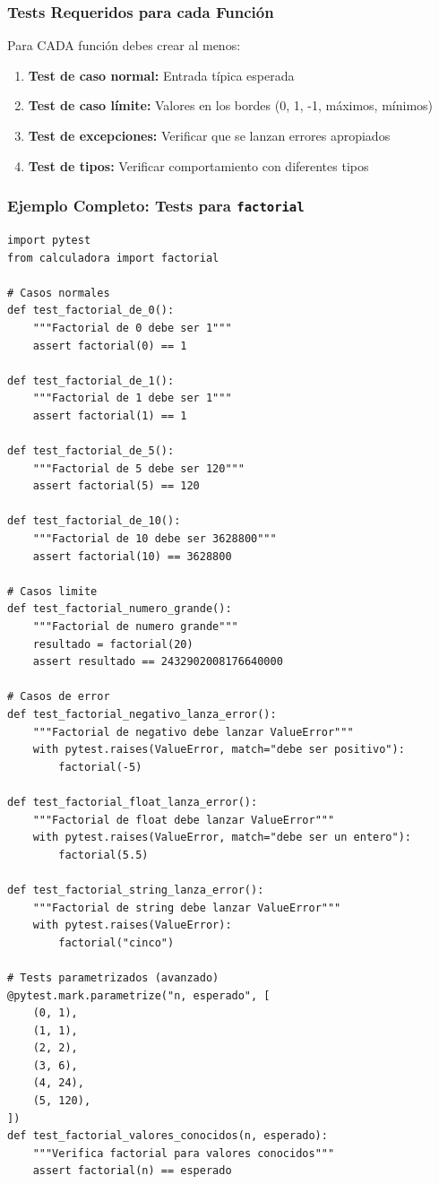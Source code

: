 \documentclass[12pt,a4paper]{article}
\begin{document}
\subsubsection{Tests Requeridos para cada Función}

Para CADA función debes crear al menos:

\begin{enumerate}[leftmargin=*]
    \item \textbf{Test de caso normal:} Entrada típica esperada
    \item \textbf{Test de caso límite:} Valores en los bordes (0, 1, -1, máximos, mínimos)
    \item \textbf{Test de excepciones:} Verificar que se lanzan errores apropiados
    \item \textbf{Test de tipos:} Verificar comportamiento con diferentes tipos
\end{enumerate}

\subsubsection{Ejemplo Completo: Tests para \texttt{factorial}}

\begin{lstlisting}[caption=Tests completos para factorial]
import pytest
from calculadora import factorial

# Casos normales
def test_factorial_de_0():
    """Factorial de 0 debe ser 1"""
    assert factorial(0) == 1

def test_factorial_de_1():
    """Factorial de 1 debe ser 1"""
    assert factorial(1) == 1

def test_factorial_de_5():
    """Factorial de 5 debe ser 120"""
    assert factorial(5) == 120

def test_factorial_de_10():
    """Factorial de 10 debe ser 3628800"""
    assert factorial(10) == 3628800

# Casos limite
def test_factorial_numero_grande():
    """Factorial de numero grande"""
    resultado = factorial(20)
    assert resultado == 2432902008176640000

# Casos de error
def test_factorial_negativo_lanza_error():
    """Factorial de negativo debe lanzar ValueError"""
    with pytest.raises(ValueError, match="debe ser positivo"):
        factorial(-5)

def test_factorial_float_lanza_error():
    """Factorial de float debe lanzar ValueError"""
    with pytest.raises(ValueError, match="debe ser un entero"):
        factorial(5.5)

def test_factorial_string_lanza_error():
    """Factorial de string debe lanzar ValueError"""
    with pytest.raises(ValueError):
        factorial("cinco")

# Tests parametrizados (avanzado)
@pytest.mark.parametrize("n, esperado", [
    (0, 1),
    (1, 1),
    (2, 2),
    (3, 6),
    (4, 24),
    (5, 120),
])
def test_factorial_valores_conocidos(n, esperado):
    """Verifica factorial para valores conocidos"""
    assert factorial(n) == esperado
\end{lstlisting}
\end{document}
